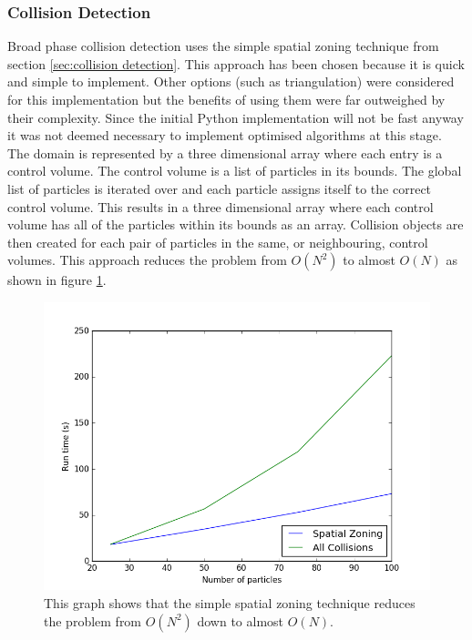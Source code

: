 \documentclass[10pt,a4paper,titlepage]{report}
\begin{document}
\subsubsection{Collision Detection}
\label{sec:Python Collision Detection}
Broad phase collision detection uses the simple spatial zoning technique from section \ref{sec:collision detection}. This approach has been chosen because it is quick and simple to implement. Other options (such as triangulation\cite{dynamictriangulations}) were considered for this implementation but the benefits of using them were far outweighed by their complexity. Since the initial Python implementation will not be fast anyway it was not deemed necessary to implement optimised algorithms at this stage.
\\The domain is represented by a three dimensional array where each entry is a control volume. The control volume is a list of particles in its bounds. The global list of particles is iterated over and each particle assigns itself to the correct control volume. This results in a three dimensional array where each control volume has all of the particles within its bounds as an array. Collision objects are then created for each pair of particles in the same, or neighbouring, control volumes. This approach reduces the problem from $O(N^{2})$ to almost $O(N)$ as shown in figure \ref{fig:run_time_against_N_python}.
\begin{figure}[!ht]
\centering
\includegraphics[scale=0.75]{figures/RunTimeAgainstNumberOfParticlesPython.png}
\caption{This graph shows that the simple spatial zoning technique reduces the problem from $O(N^{2})$ down to almost $O(N)$.}
\label{fig:run_time_against_N_python}
\end{figure}
\end{document}
